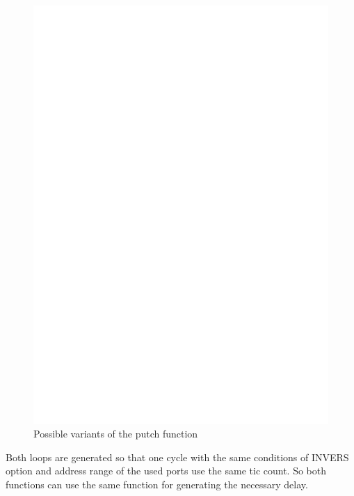 \begin{figure}[H]
\centering
\includegraphics[]{../FIG/uart_putch_timing.eps}
\caption{Possible variants of the putch function}
\label{fig:putch_timing}
\end{figure}

Both loops are generated so that one cycle with the same conditions of INVERS option and
address range of the used ports use the same tic count.
So both functions can use the same function for generating the necessary delay.

